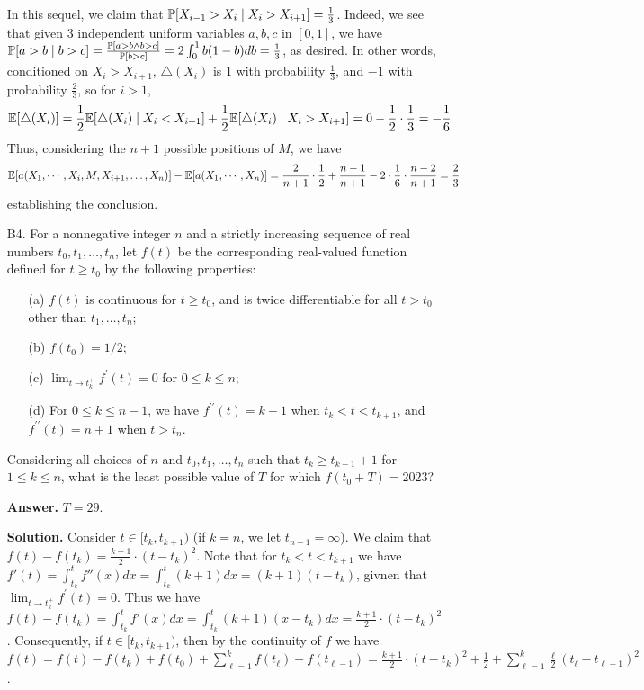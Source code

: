 \documentclass[11pt,a4paper]{article}
\begin{document}
\begin{enumerate}
		In this sequel, we claim that ${\mathbb P}[X_{i - 1} > X_i \mid X_i > X_{i + 1}] = \frac 13$. 
		Indeed, we see that given 3 independent uniform variables $a, b, c$ in $[0, 1]$, 
		we have ${\mathbb P}[a > b \mid b > c] = \frac{{\mathbb P}[a > b\land b > c]}{{\mathbb P}[b > c]} = 2\int_0^1 b(1-b)db = \frac 13$, 
		as desired. 
		In other words, conditioned on $X_i > X_{i + 1}$, 
		$\triangle (X_i) $ is 1 with probability $\frac 13$, and $-1$ with probability $\frac 23$, 
		so for $i > 1$, 
		\[{\mathbb E}[\triangle (X_i)] 
		=\frac 12 {\mathbb E}[\triangle (X_i) \mid X_i < X_{i + 1}]
		+ \frac 12 {\mathbb E}[\triangle (X_i) \mid X_i > X_{i + 1}]
		=0 - \frac 12\cdot \frac 13
		=-\frac 16
		\]
		Thus, considering the $n + 1$ possible positions of $M$, we have 
		\[
		{\mathbb E}[a(X_1, \cdots, X_i, M, X_{i + 1}, \dots, X_n)] - 
		{\mathbb E}[a(X_1, \cdots, X_n)]
		=\frac{2}{n + 1}\cdot\frac 12 + \frac{n - 1}{n + 1} - 2\cdot \frac{1}{6}\cdot \frac{n - 2}{n + 1}
		=\frac 23
		\]
		establishing the conclusion. 
		
		\item [B4.]
		For a nonnegative integer $n$ and a strictly increasing sequence of real numbers $t_0, t_1, \ldots, t_n$, let $f(t)$ be the corresponding real-valued function defined for $t \geq t_0$ by the following properties:
		\begin{enumerate}
			\item [(a)]$f(t)$ is continuous for $t \geq t_0$, and is twice differentiable for all $t>t_0$ other than $t_1, \ldots, t_n$;
			
			\item [(b)]$f\left(t_0\right)=1 / 2$;
			
			\item [(c)] $\lim _{t \rightarrow t_k^{+}} f^{\prime}(t)=0$ for $0 \leq k \leq n$;
			
			\item [(d)] For $0 \leq k \leq n-1$, we have $f^{\prime \prime}(t)=k+1$ when $t_k<t<t_{k+1}$, and $f^{\prime \prime}(t)=n+1$ when $t>t_n$.
		\end{enumerate}
		
		Considering all choices of $n$ and $t_0, t_1, \ldots, t_n$ such that $t_k \geq t_{k-1}+1$ for $1 \leq k \leq n$, what is the least possible value of $T$ for which $f\left(t_0+T\right)=2023$?
		
		\textbf{Answer.} $T = 29$. 
		
		\textbf{Solution.} Consider $t\in [t_k, t_{k + 1})$ (if $k=n$, we let $t_{n + 1} = \infty$). 
		We claim that $f(t) - f(t_k) = \frac{k + 1}{2}\cdot (t - t_k)^2$. 
		Note that for $t_k < t < t_{k + 1}$ we have 
		$f'(t) = \int_{t_k}^{t} f''(x)dx = \int_{t_k}^t (k + 1) dx = (k + 1)(t - t_k)$, 
		givnen that $\lim _{t \rightarrow t_k^{+}} f^{\prime}(t)=0$. 
		Thus we have 
		$f(t) - f(t_k) =  \int_{t_k}^{t} f'(x)dx = \int_{t_k}^t (k + 1)(x - t_k) dx = \frac{k + 1}{2}\cdot (t - t_k)^2$. 
		Consequently, if $t\in  [t_k, t_{k + 1})$, 
		then by the continuity of $f$ we have 
		$f(t) = f(t) - f(t_k) + f(t_0) + \sum_{\ell=1}^{k} f(t_{\ell}) - f(t_{\ell - 1})
		=\frac{k + 1}{2}\cdot (t - t_k)^2 + \frac 12 +\sum_{\ell=1}^{k} \frac{\ell}{2} (t_{\ell} - t_{\ell - 1})^2$. 
		

\end{enumerate}
\end{document}
